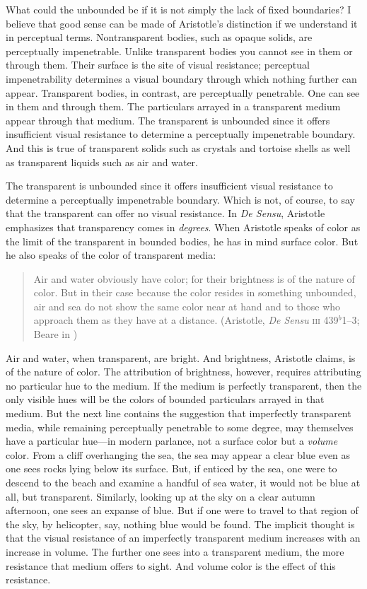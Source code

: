 \documentclass[12pt]{article}
\begin{document}
What could the unbounded be if it is not simply the lack of fixed boundaries? I believe that good sense can be made of Aristotle's distinction if we understand it in perceptual terms. Nontransparent bodies, such as opaque solids, are perceptually impenetrable. Unlike transparent bodies you cannot see in them or through them. Their surface is the site of visual resistance; perceptual impenetrability determines a visual boundary through which nothing further can appear. Transparent bodies, in contrast, are perceptually penetrable. One can see in them and through them. The particulars arrayed in a transparent medium appear through that medium. The transparent is unbounded since it offers insufficient visual resistance to determine a perceptually impenetrable boundary. And this is true of transparent solids such as crystals and tortoise shells as well as transparent liquids such as air and water.

The transparent is unbounded since it offers insufficient visual resistance to determine a perceptually impenetrable boundary. Which is not, of course, to say that the transparent can offer no visual resistance. In \emph{De Sensu}, Aristotle emphasizes that transparency comes in \emph{degrees}. When Aristotle speaks of color as the limit of the transparent in bounded bodies, he has in mind surface color. But he also speaks of the color of transparent media:
\begin{quote}
    Air and water obviously have color; for their brightness is of the nature of color. But in their case because the color resides in something unbounded, air and sea do not show the same color near at hand and to those who approach them as they have at a distance. (Aristotle, \emph{De Sensu} \textsc{iii} 439\( ^{b} \)1--3; Beare in \citealt[7]{Barnes:1984uq})
\end{quote}
Air and water, when transparent, are bright. And brightness, Aristotle claims, is of the nature of color. The attribution of brightness, however, requires attributing no particular hue to the medium. If the medium is perfectly transparent, then the only visible hues will be the colors of bounded particulars arrayed in that medium. But the next line contains the suggestion that imperfectly transparent media, while remaining perceptually penetrable to some degree, may themselves have a particular hue---in modern parlance, not a surface color but a \emph{volume} color. From a cliff overhanging the sea, the sea may appear a clear blue even as one sees rocks lying below its surface. But, if enticed by the sea, one were to descend to the beach and examine a handful of sea water, it would not be blue at all, but transparent. Similarly, looking up at the sky on a clear autumn afternoon, one sees an expanse of blue. But if one were to travel to that region of the sky, by helicopter, say, nothing blue would be found. The implicit thought is that the visual resistance of an imperfectly transparent medium increases with an increase in volume. The further one sees into a transparent medium, the more resistance that medium offers to sight. And volume color is the effect of this resistance.
\end{document}

